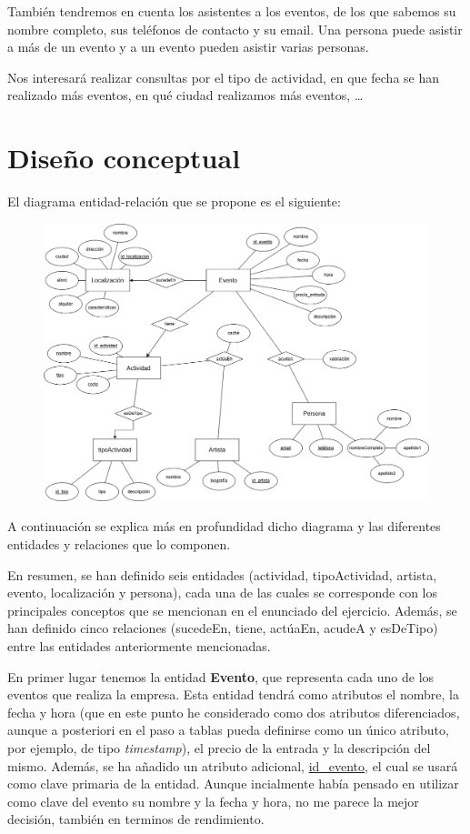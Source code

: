 \documentclass[a4paper,onecolumn]{article}
\let\stdsection\section
\renewcommand\section{\newpage\stdsection}
\begin{document}
\begin{sloppypar}
También tendremos en cuenta los asistentes a los eventos, de los que sabemos su nombre completo, sus teléfonos
de contacto y su email. Una persona puede asistir a más de un evento y a un evento pueden asistir varias personas.

Nos interesará realizar consultas por el tipo de actividad, en que fecha se han realizado más eventos, en qué ciudad
realizamos más eventos, …

\section{Diseño conceptual} \label{mer}
El diagrama entidad-relación que se propone es el siguiente:
\begin{center}
    \begin{figure}[h!]
        \includegraphics[width=\textwidth]{MER.png}
    \end{figure}
\end{center}

A continuación se explica más en profundidad dicho diagrama y las diferentes entidades y relaciones que lo componen.

En resumen, se han definido seis entidades (actividad, tipoActividad, artista, evento, localización y persona), cada una de las 
cuales se corresponde con los principales conceptos que se mencionan en el enunciado del ejercicio. Además, se han definido
cinco relaciones (sucedeEn, tiene, actúaEn, acudeA y esDeTipo) entre las entidades anteriormente mencionadas.

En primer lugar tenemos la entidad \textbf{Evento}, que representa cada uno de los eventos que realiza la empresa. Esta entidad tendrá como atributos
el nombre, la fecha y hora (que en este punto he considerado como dos atributos diferenciados, aunque a posteriori en el paso a tablas pueda
definirse como un único atributo, por ejemplo, de tipo \textit{timestamp}), el precio de la entrada y la descripción del mismo. Además, se ha
añadido un atributo adicional, \underline{id\_evento}, el cual se usará como clave primaria de la entidad. Aunque incialmente había pensado en 
utilizar como clave del evento su nombre y la fecha y hora, no me parece la mejor decisión, también en terminos de rendimiento.


\end{sloppypar}
\end{document}
